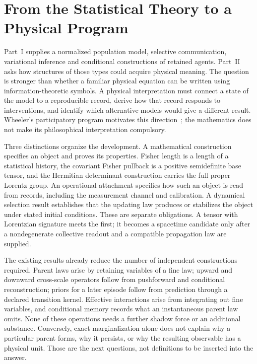 \section{From the Statistical Theory to a Physical Program}\label{sec:part2_preamble}

Part~I supplies a normalized population model, selective communication, variational inference and conditional constructions of retained agents. Part~II asks how structures of those types could acquire physical meaning. The question is stronger than whether a familiar physical equation can be written using information-theoretic symbols. A physical interpretation must connect a state of the model to a reproducible record, derive how that record responds to interventions, and identify which alternative models would give a different result. Wheeler's participatory program motivates this direction~\cite{Wheeler1990}; the mathematics does not make its philosophical interpretation compulsory.

Three distinctions organize the development. A mathematical construction specifies an object and proves its properties. Fisher length is a length of a statistical history, the covariant Fisher pullback is a positive semidefinite base tensor, and the Hermitian determinant construction carries the full proper Lorentz group. An operational attachment specifies how such an object is read from records, including the measurement channel and calibration. A dynamical selection result establishes that the updating law produces or stabilizes the object under stated initial conditions. These are separate obligations. A tensor with Lorentzian signature meets the first; it becomes a spacetime candidate only after a nondegenerate collective readout and a compatible propagation law are supplied.

The existing results already reduce the number of independent constructions required. Parent laws arise by retaining variables of a fine law; upward and downward cross-scale operators follow from pushforward and conditional reconstruction; priors for a later episode follow from prediction through a declared transition kernel. Effective interactions arise from integrating out fine variables, and conditional memory records what an instantaneous parent law omits. None of these operations needs a further shadow force or an additional substance. Conversely, exact marginalization alone does not explain why a particular parent forms, why it persists, or why the resulting observable has a physical unit. Those are the next questions, not definitions to be inserted into the answer.

